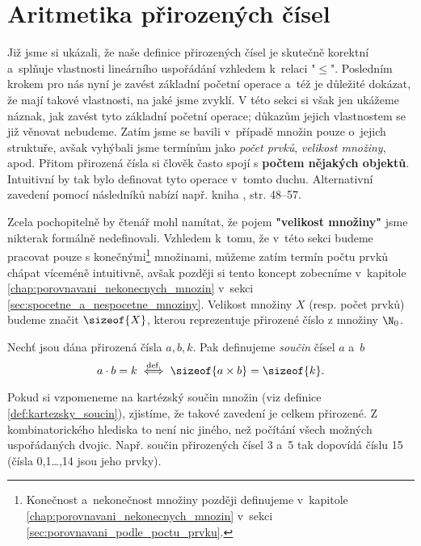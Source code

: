 \section{Aritmetika přirozených čísel}\label{sec:aritmetika_prirozenych_cisel}
Již jsme si ukázali, že naše definice přirozených čísel je skutečně korektní a~splňuje vlastnosti lineárního uspořádání vzhledem k~relaci "$\leq$". Posledním krokem pro nás nyní je zavést základní početní operace a~též je důležité dokázat, že mají takové vlastnosti, na jaké jsme zvyklí. V této sekci si však jen ukážeme náznak, jak zavést tyto základní početní operace; důkazům jejich vlastnostem se již věnovat nebudeme. Zatím jsme se bavili v~případě množin pouze o~jejich struktuře, avšak vyhýbali jsme termínům jako \emph{počet prvků}, \emph{velikost množiny}, apod. Přitom přirozená čísla si člověk často spojí s \textbf{počtem nějakých objektů}. Intuitivní by tak bylo definovat tyto operace v~tomto duchu. Alternativní zavedení pomocí následníků nabízí např. kniha \cite{Goldrei2017}, str. 48--57.\par
Zcela pochopitelně by čtenář mohl namítat, že pojem \textbf{"velikost množiny"} jsme nikterak formálně nedefinovali. Vzhledem k~tomu, že v~této sekci budeme pracovat pouze s konečnými\footnote{Konečnost a~nekonečnost množiny později definujeme v~kapitole \ref{chap:porovnavani_nekonecnych_mnozin} v~sekci \ref{sec:porovnavani_podle_poctu_prvku}.} množinami, můžeme zatím termín počtu prvků chápat víceméně intuitivně, avšak později si tento koncept zobecníme v~kapitole \ref{chap:porovnavani_nekonecnych_mnozin} v~sekci \ref{sec:spocetne_a_nespocetne_mnoziny}. Velikost množiny $X$ (resp. počet prvků) budeme značit $\sizeof{X}$, kterou reprezentuje přirozené číslo z množiny $\N_0$.\par
\begin{definition}\label{def:soucin_pritozenych_cisel}
    Nechť jsou dána přirozená čísla $a,b,k$. Pak definujeme \emph{součin} čísel $a$ a~$b$
    \begin{equation*}
        a\cdot b=k\stackrel{\text{def.}}{\iff} \sizeof{a\times b}=\sizeof{k}.
    \end{equation*}
\end{definition}
Pokud si vzpomeneme na kartézský součin množin (viz definice \ref{def:kartezsky_soucin}), zjistíme, že takové zavedení je celkem přirozené. Z kombinatorického hlediska to není nic jiného, než počítání všech možných uspořádaných dvojic. Např. součin přirozených čísel 3 a~5 tak dopovídá číslu 15 (čísla 0,1\dots,14 jsou jeho prvky).\par
